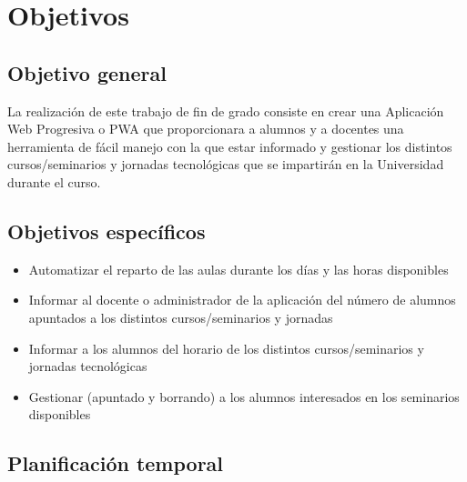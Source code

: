 \documentclass[a4paper, 12pt]{book}
\begin{document}

\cleardoublepage %
\chapter{Objetivos} %
\label{chap:objetivos} %

\section{Objetivo general} %
\label{sec:objetivo-general} %

La realización de este trabajo de fin de grado consiste en crear una Aplicación Web Progresiva o PWA que proporcionara a alumnos y a docentes una herramienta de fácil manejo con la que estar informado y gestionar los distintos cursos/seminarios y jornadas tecnológicas que se impartirán en la Universidad durante el curso.


\section{Objetivos específicos}
\label{sec:objetivos-especificos}

\begin{itemize}
  \item Automatizar el reparto de las aulas durante los días y las horas disponibles
  \item Informar al docente o administrador de la aplicación del número de alumnos apuntados a los distintos cursos/seminarios y jornadas
  \item Informar a los alumnos del horario de los distintos cursos/seminarios y jornadas tecnológicas
  \item Gestionar (apuntado y borrando) a los alumnos interesados en los seminarios disponibles
\end{itemize}


\section{Planificación temporal}
\label{sec:planificacion-temporal}
\end{document}
